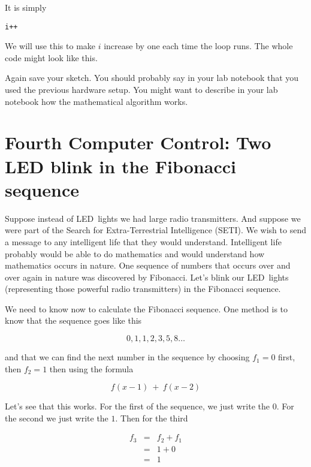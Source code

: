 It is simply

\begin{lstlisting}[language=Arduino]
  i++
\end{lstlisting}

We will use this to make $i$ increase by one each time the loop runs. The whole code might look like this.



Again save your sketch. You should probably say in your lab notebook that
you used the previous hardware setup. You might want to describe in your lab
notebook how the mathematical algorithm works.

\section{Fourth Computer Control: Two LED blink in the Fibonacci sequence}

Suppose instead of LED\ lights we had large radio transmitters. And suppose
we were part of the Search for Extra-Terrestrial Intelligence (SETI). We
wish to send a message to any intelligent life that they would understand.
Intelligent life probably would be able to do mathematics and would
understand how mathematics occurs in nature. One sequence of numbers that
occurs over and over again in nature was discovered by Fibonacci. Let's
blink our LED\ lights (representing those powerful radio transmitters) in
the Fibonacci sequence.

We need to know now to calculate the Fibonacci sequence. One method is to
know that the sequence goes like this

\begin{equation*}
	0,1,1,2,3,5,8\ldots
\end{equation*}

and that we can find the next number in the sequence by choosing $f_{1}=0$
first, then $f_{2}=1$ then using the formula 

\begin{equation*}
	f(x-1)\ +\ f(x-2)
\end{equation*}

Let's see that this works. For the first of the sequence, we just write the $
0.$ For the second we just write the $1.$ Then for the third 

\begin{eqnarray*}
	f_{3} &=&f_{2}+f_{1} \\
	&=&1+0 \\
	&=&1
\end{eqnarray*}

